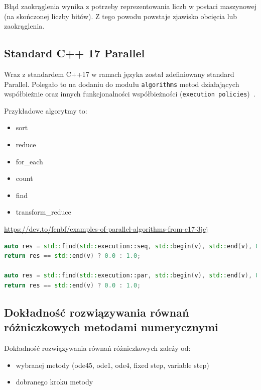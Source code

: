 \documentclass[wi]{zut}
\begin{document}
Błąd zaokrąglenia wynika z potrzeby reprezentowania liczb w postaci maszynowej (na skończonej liczby bitów). Z tego powodu powstaje zjawisko obcięcia lub zaokrąglenia.

\subsection{Standard C++ 17 Parallel}

Wraz z standardem C++17 w ramach języka został zdefiniowany standard Parallel. Polegało to na dodaniu do modułu \lstinline{algorithms} metod działających współbieżnie oraz innych funkcjonalności współbieżności (\lstinline{execution policies})~\cite{C++17}.

Przykładowe algorytmy to:

\begin{itemize}
    \item sort
    \item reduce
    \item for\_each
    \item count
    \item find
    \item transform\_reduce~\cite{MicrosoftCPP17}
\end{itemize}


{\url{https://dev.to/fenbf/examples-of-parallel-algorithms-from-c17-3jej}}{\label{kod:przyklad}}
\begin{lstlisting}[language=C++]
auto res = std::find(std::execution::seq, std::begin(v), std::end(v), 0.6);
return res == std::end(v) ? 0.0 : 1.0;

auto res = std::find(std::execution::par, std::begin(v), std::end(v), 0.6);
return res == std::end(v) ? 0.0 : 1.0;
\end{lstlisting}


\subsection{Dokładność rozwiązywania równań różniczkowych metodami numerycznymi}

Dokładność rozwiązywania równań różniczkowych zależy od:

\begin{itemize}
    \item wybranej metody (ode45, ode1, ode4, fixed step, variable step)
    \item dobranego kroku metody
\end{itemize}
\question
\end{document}
